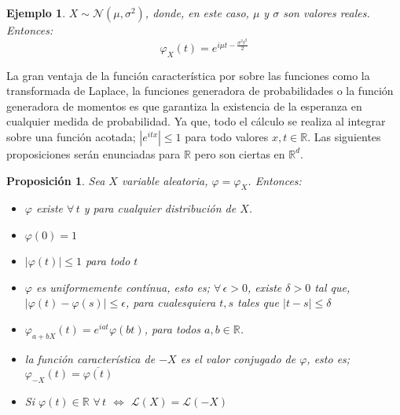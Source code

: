 \documentclass[a4paper]{article}
\newtheorem{ejemplo}{Ejemplo}
\newtheorem{prop}{Proposici\'on}
\numberwithin{equation}{subsection}
\def\R{\mathbb R}
\begin{document}
\begin{ejemplo}
 $X\sim \mathcal{N}(\mu,\sigma^{2})$, donde, en este caso, $\mu$ y $\sigma$ son valores reales. Entonces:
 \[\varphi_X(t) = e^{i\mu t -\frac{\sigma^2 t^2}{2}}\]
\end{ejemplo}

La gran ventaja de la función característica por sobre las funciones como la transformada de Laplace, la funciones generadora de probabilidades o la función generadora de momentos es que garantiza la existencia de la esperanza en cualquier medida de probabilidad. Ya que, todo el cálculo se realiza al integrar sobre una función acotada; $|e^{itx}|\leq 1$ para todo valores $x,t \in \R$. Las siguientes proposiciones serán enunciadas para $\R$ pero son ciertas en $\R^d$.

\begin{prop} Sea $X$ variable aleatoria, $\varphi = \varphi_X$. Entonces:
\begin{itemize}
    \item[i)] $\varphi$ existe $\forall\,t$ y para cualquier distribución de $X$.
    \item[ii)] $\varphi(0)=1$
    \item[iii)] $|\varphi(t)|\leq 1$ para todo $t$
    \item[iv)] $\varphi$ es uniformemente contínua, esto es; $\forall\,\epsilon >0$, existe $\delta >0$ tal que, $|\varphi(t)-\varphi(s)|\leq \epsilon$, para cualesquiera $t, s$ tales que $|t-s|\leq \delta$
    \item[v)] $\varphi_{a +bX}(t) = e^{iat}\varphi(bt)$, para todos $a,b\in\R$.
    \item[vi)] la función característica de $-X$ es el valor conjugado de $\varphi$, esto es; $\varphi_{-X}(t) = \overline{\varphi(t)}$
    \item[vii)] Si $\varphi(t)\in \R\,\,\forall\,t$ $\Longleftrightarrow$ $\mathcal{L}(X) = \mathcal{L}(-X)$
\end{itemize}
\end{prop}
\end{document}
